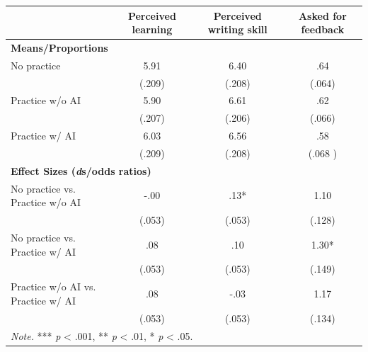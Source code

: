 \documentclass[11pt]{report}
\begin{document}
\begin{append}
\begin{table}[h]
\begin{tabular}{lccc}
\toprule
  & Perceived learning & Perceived writing skill & Asked for feedback \\ 
\midrule
\multicolumn{4}{l}{\textbf{Means/Proportions}} \\ 
\midrule
No practice & 5.91 & 6.40 & .64 \\ 
 & (.209) & (.208) & (.064) \\ 
Practice w/o AI & 5.90 & 6.61 & .62 \\ 
 & (.207) & (.206) & (.066) \\ 
Practice w/ AI & 6.03 & 6.56 & .58 \\ 
 & (.209) & (.208) & (.068 ) \\ 
\midrule
\multicolumn{4}{l}{\textbf{Effect Sizes (\textit{d}s/odds ratios)}} \\ 
\midrule
No practice vs. Practice w/o AI & -.00 & .13* & 1.10 \\ 
 & (.053) & (.053) & (.128) \\ 
No practice vs. Practice w/ AI & .08 & .10 & 1.30* \\ 
 & (.053) & (.053) & (.149) \\ 
Practice w/o AI vs. Practice w/ AI & .08 & -.03 & 1.17 \\ 
 & (.053) & (.053) & (.134) \\ 
\midrule
\multicolumn{4}{l}{\textit{Note.} *** \textit{p} < .001, ** \textit{p} < .01, * \textit{p} < .05.}
\vspace{5pt}
\end{tabular}
    \label{tab:motivation2}
\end{table}

\FloatBarrier

\end{append}
\end{document}
